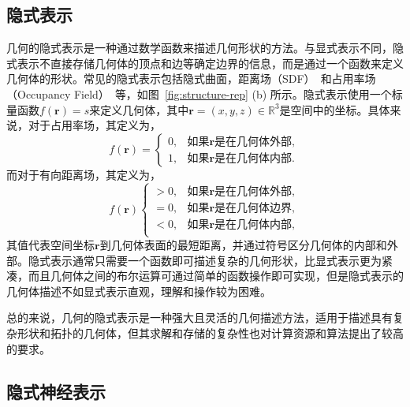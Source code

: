 \subsection{隐式表示}
几何的隐式表示是一种通过数学函数来描述几何形状的方法。与显式表示不同，隐式表示不直接存储几何体的顶点和边等确定边界的信息，而是通过一个函数来定义几何体的形状。常见的隐式表示包括隐式曲面，距离场（SDF）~\cite{park2019deepsdf,yang2021geometry}和占用率场（Occupancy Field）~\cite{mescheder2019occupancy}等，如图~\ref{fig:structure-rep} (b) 所示。隐式表示使用一个标量函数$f(\mathbf{r})=s$来定义几何体，其中$\mathbf{r}=(x,y,z)\in\mathbb{R}^3$是空间中的坐标。具体来说，对于占用率场，其定义为，
\begin{equation}
f(\mathbf{r})=
    \begin{cases}
        0, & \text{如果}\mathbf{r}\text{是在几何体外部},\\
        1, & \text{如果}\mathbf{r}\text{是在几何体内部}.
    \end{cases}
\end{equation}
而对于有向距离场，其定义为，
\begin{equation}
f(\mathbf{r})
    \begin{cases}
        >0, & \text{如果}\mathbf{r}\text{是在几何体外部},\\
        =0, & \text{如果}\mathbf{r}\text{是在几何体边界},\\
        <0, & \text{如果}\mathbf{r}\text{是在几何体内部},\\
    \end{cases}
\end{equation}
其值代表空间坐标$\mathbf{r}$到几何体表面的最短距离，并通过符号区分几何体的内部和外部。隐式表示通常只需要一个函数即可描述复杂的几何形状，比显式表示更为紧凑，而且几何体之间的布尔运算可通过简单的函数操作即可实现，但是隐式表示的几何体描述不如显式表示直观，理解和操作较为困难。

总的来说，几何的隐式表示是一种强大且灵活的几何描述方法，适用于描述具有复杂形状和拓扑的几何体，但其求解和存储的复杂性也对计算资源和算法提出了较高的要求。

\subsection{隐式神经表示}

